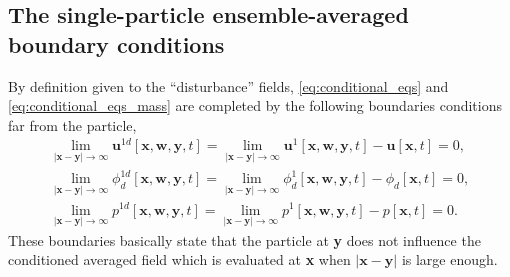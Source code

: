 \subsection{The single-particle ensemble-averaged boundary conditions}


By definition given to the ``disturbance'' fields, \ref{eq:conditional_eqs} and \ref{eq:conditional_eqs_mass} are completed by the following boundaries conditions far from the particle, 
\begin{align}
    \lim_{|\textbf{x}-\textbf{y}|\to\infty} 
    \textbf{u}^{1d}[\textbf{x},\textbf{w},\textbf{y},t] 
    = 
    \lim_{|\textbf{x}-\textbf{y}|\to\infty} 
    \textbf{u}^{1}[\textbf{x},\textbf{w},\textbf{y},t] 
    - \textbf{u}[\textbf{x},t] 
    = 0, \\
    \lim_{|\textbf{x}-\textbf{y}|\to\infty} 
    \phi_d^{1d}[\textbf{x},\textbf{w},\textbf{y},t] 
    = 
    \lim_{|\textbf{x}-\textbf{y}|\to\infty} 
    \phi_d^{1}[\textbf{x},\textbf{w},\textbf{y},t] 
    - \phi_d[\textbf{x},t] 
    = 0, \\
    \lim_{|\textbf{x}-\textbf{y}|\to\infty} 
    p^{1d}[\textbf{x},\textbf{w},\textbf{y},t] 
    = 
    \lim_{|\textbf{x}-\textbf{y}|\to\infty} 
    p^{1}[\textbf{x},\textbf{w},\textbf{y},t] 
    - p[\textbf{x},t] 
    = 0. 
    \label{eq:boundary_at_infinity}
\end{align}
These boundaries basically state that the particle at \textbf{y} does not influence the conditioned averaged field which is evaluated at \textbf{x} when $|\textbf{x}-\textbf{y}|$ is large enough. 

